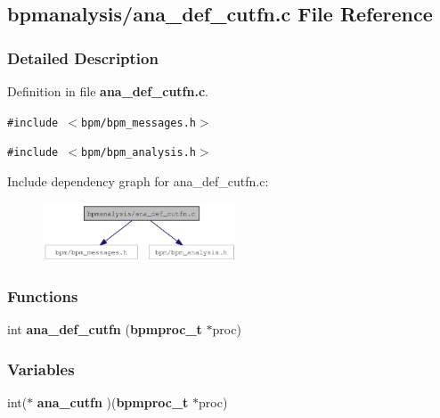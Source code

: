 \subsection{bpmanalysis/ana\_\-def\_\-cutfn.c File Reference}
\label{ana__def__cutfn_8c}


\subsubsection{Detailed Description}


Definition in file {\bf ana\_\-def\_\-cutfn.c}.

{\tt \#include $<$bpm/bpm\_\-messages.h$>$}\par
{\tt \#include $<$bpm/bpm\_\-analysis.h$>$}\par


Include dependency graph for ana\_\-def\_\-cutfn.c:\nopagebreak
\begin{figure}[H]
\begin{center}
\leavevmode
\includegraphics[width=163pt]{ana__def__cutfn_8c__incl}
\end{center}
\end{figure}
\subsubsection*{Functions}
\begin{CompactItemize}
\item 
int {\bf ana\_\-def\_\-cutfn} ({\bf bpmproc\_\-t} $\ast$proc)
\end{CompactItemize}
\subsubsection*{Variables}
\begin{CompactItemize}
\item 
int($\ast$ \textbf{ana\_\-cutfn} )({\bf bpmproc\_\-t} $\ast$proc)\label{ana__def__cutfn_8c_5a54b84177636f0b114cbed86a00643b}

\end{CompactItemize}
